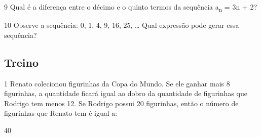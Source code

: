 \begin{escolha}
\begin{boxmedio}
\begin{boxmedio}
{\begin{boxpeq}
\begin{boxpeq}
{\begin{boxpeq}
\begin{boxmedio}
\begin{boxmedio}
\begin{boxpeq}
\begin{boxmedio}
\begin{boxpeq}
\begin{boxpeq}
\begin{boxpeq}
\begin{boxpeq}
\begin{boxmedio}
{\begin{boxmedio}
\begin{boxmedio}
\begin{boxpeq}
\begin{boxmedio}
\begin{boxpeq}
\begin{boxpeq}
\begin{boxpeq}
\begin{escolha}
{\begin{boxmedio}
\begin{boxpeq}
\begin{boxpeq}

\num{9} Qual é a diferença entre o décimo e o quinto termos da sequência 
a\textsubscript{n} = 3n + 2?

\begin{boxpeq}

\num{10} Observe a sequência: 0, 1, 4, 9, 16, 25, \ldots{}
Qual expressão pode gerar essa sequência?

\begin{boxpeq}

\section{Treino}

\num{1} Renato colecionou figurinhas da Copa do Mundo. Se ele ganhar mais 8
figurinhas, a quantidade ficará igual ao dobro da quantidade de figurinhas 
que Rodrigo tem menos 12. Se Rodrigo possui 20 figurinhas, então o número de
figurinhas que Renato tem é igual a:

\begin{escolha}

  \item 40


\end{escolha}
\end{boxpeq}
\end{boxpeq}
\end{boxpeq}
\end{boxpeq}
\end{boxmedio}}
\end{escolha}
\end{boxpeq}
\end{boxpeq}
\end{boxpeq}
\end{boxmedio}
\end{boxpeq}
\end{boxmedio}
\end{boxmedio}}
\end{boxmedio}
\end{boxpeq}
\end{boxpeq}
\end{boxpeq}
\end{boxpeq}
\end{boxmedio}
\end{boxpeq}
\end{boxmedio}
\end{boxmedio}
\end{boxpeq}}
\end{boxpeq}
\end{boxpeq}}
\end{boxmedio}
\end{boxmedio}
\end{escolha}
